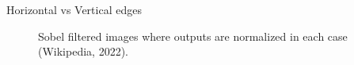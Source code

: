 \begin{frame}{Horizontal vs Vertical edges}
    \begin{figure}
        \centering
         \caption{{Sobel filtered images where outputs are normalized in each case (Wikipedia, 2022).}}
    \end{figure}
\end{frame}

